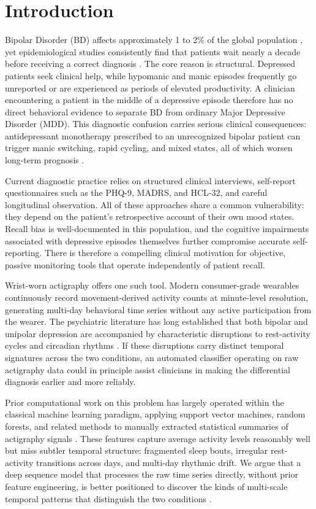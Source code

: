 \section{Introduction}

Bipolar Disorder (BD) affects approximately 1 to 2\% of the global population \cite{merikangas2007prevalence}, yet epidemiological studies consistently find that patients wait nearly a decade before receiving a correct diagnosis \cite{hirschfeld2003perceptions}. The core reason is structural. Depressed patients seek clinical help, while hypomanic and manic episodes frequently go unreported or are experienced as periods of elevated productivity. A clinician encountering a patient in the middle of a depressive episode therefore has no direct behavioral evidence to separate BD from ordinary Major Depressive Disorder (MDD). This diagnostic confusion carries serious clinical consequences: antidepressant monotherapy prescribed to an unrecognized bipolar patient can trigger manic switching, rapid cycling, and mixed states, all of which worsen long-term prognosis \cite{ghaemi2004antidepressants}.

Current diagnostic practice relies on structured clinical interviews, self-report questionnaires such as the PHQ-9, MADRS, and HCL-32, and careful longitudinal observation. All of these approaches share a common vulnerability: they depend on the patient's retrospective account of their own mood states. Recall bias is well-documented in this population, and the cognitive impairments associated with depressive episodes themselves further compromise accurate self-reporting. There is therefore a compelling clinical motivation for objective, passive monitoring tools that operate independently of patient recall.

Wrist-worn actigraphy offers one such tool. Modern consumer-grade wearables continuously record movement-derived activity counts at minute-level resolution, generating multi-day behavioral time series without any active participation from the wearer. The psychiatric literature has long established that both bipolar and unipolar depression are accompanied by characteristic disruptions to rest-activity cycles and circadian rhythms \cite{wehr1987sleep,boudebesse2014sleep}. If these disruptions carry distinct temporal signatures across the two conditions, an automated classifier operating on raw actigraphy data could in principle assist clinicians in making the differential diagnosis earlier and more reliably.

Prior computational work on this problem has largely operated within the classical machine learning paradigm, applying support vector machines, random forests, and related methods to manually extracted statistical summaries of actigraphy signals \cite{garcia2018depresjon,zanella2019feature}. These features capture average activity levels reasonably well but miss subtler temporal structure: fragmented sleep bouts, irregular rest-activity transitions across days, and multi-day rhythmic drift. We argue that a deep sequence model that processes the raw time series directly, without prior feature engineering, is better positioned to discover the kinds of multi-scale temporal patterns that distinguish the two conditions \cite{lecun2015deep}.

